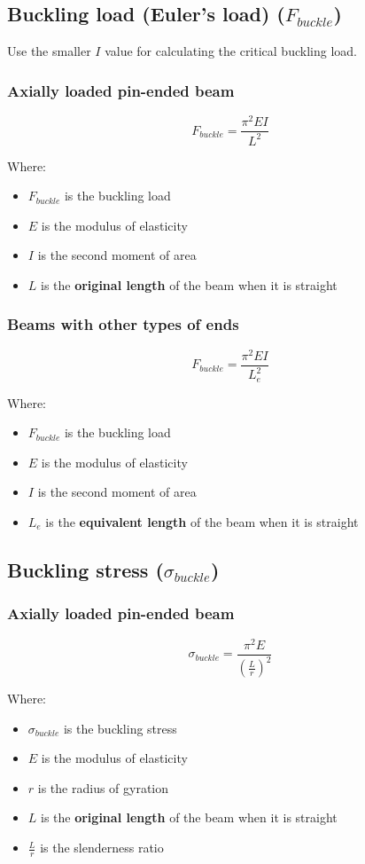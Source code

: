 \documentclass[11pt]{article}
\begin{document}
\subsection{Buckling load (Euler's load) (\(F_{buckle}\))}
\label{sec:org86047c2}
Use the smaller \(I\) value for calculating the critical buckling load.
\subsubsection{Axially loaded pin-ended beam}
\label{sec:org93c0b75}
\[F_{buckle} = \frac{\pi^2 EI}{L^2}\]

Where:
\begin{itemize}
\item \(F_{buckle}\) is the buckling load
\item \(E\) is the modulus of elasticity
\item \(I\) is the second moment of area
\item \(L\) is the \textbf{original length} of the beam when it is straight
\end{itemize}
\subsubsection{Beams with other types of ends}
\label{sec:org5fe8b6d}
\[F_{buckle} = \frac{\pi^2 EI}{L_e^2}\]

Where:
\begin{itemize}
\item \(F_{buckle}\) is the buckling load
\item \(E\) is the modulus of elasticity
\item \(I\) is the second moment of area
\item \(L_e\) is the \textbf{equivalent length} of the beam when it is straight
\end{itemize}
\subsection{Buckling stress (\(\sigma_{buckle}\))}
\label{sec:orgfafb80b}

\subsubsection{Axially loaded pin-ended beam}
\label{sec:orgc12f958}
\[\sigma_{buckle} = \frac{\pi^2 E}{\left( \frac{L}{r} \right)^2}\]

Where:
\begin{itemize}
\item \(\sigma_{buckle}\) is the buckling stress
\item \(E\) is the modulus of elasticity
\item \(r\) is the radius of gyration
\item \(L\) is the \textbf{original length} of the beam when it is straight
\item \(\frac{L}{r}\) is the slenderness ratio
\end{itemize}
\end{document}
